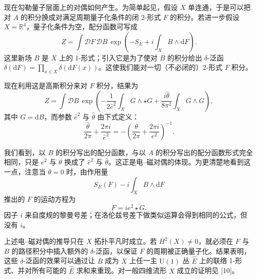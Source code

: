 \documentclass[11pt,a4paper,UTF8]{ctexart}
\begin{document}
现在勾勒量子层面上的对偶如何产生。为简单起见，假设 $X$ 单连通，于是可以把对 $A$ 的积分换成对满足周期量子化条件的闭 2-形式 $F$ 的积分。若进一步假设 $X=\mathbb{R}^{4}$，量子化条件为空，配分函数可写成
\[
    Z=\int \mathcal{D}F\,\mathcal{D}B\, \exp\left(-S_{E}+i\int_{X}B\wedge\mathrm{d}F\right).
\]
这里新场 $B$ 是 $X$ 上的 1-形式；引入它是为了使对 $B$ 的积分给出 $\delta$-泛函 $\delta(\mathrm{d}F)=\prod_{x\in X}\delta(\mathrm{d}F(x))$。这使我们能对一切（不必闭的）2-形式 $F$ 积分。

现在利用这是高斯积分来对 $F$ 积分，结果为
\[
    Z=\int \mathcal{D}B\, \exp\left(-\frac{1}{2\hat{e}^{2}}\int_{X}G\wedge\star G+\frac{i\hat{\theta}}{8\pi^{2}}\int_{X}G\wedge G\right),
\]
其中 $G=\mathrm{d}B$，而参数 $\hat{e}^{2}$ 与 $\hat{\theta}$ 由下式定义：
\[
    \frac{\hat{\theta}}{2\pi}+\frac{2\pi i}{\hat{e}^{2}}=-\left(\frac{\theta}{2\pi}+\frac{2\pi i}{e^{2}}\right)^{-1}.
\]


我们看到，以 $B$ 的积分写出的配分函数，与以 $A$ 的积分写出的配分函数形式完全相同，只是 $e^{2}$ 与 $\theta$ 换成了 $\hat{e}^{2}$ 与 $\hat{\theta}$。这正是电–磁对偶的体现。为更清楚地看到这一点，注意当 $\theta=0$ 时，由作用量
\[
    S_{E}(F)-i\int_{X}B\wedge\mathrm{d}F
\]
推出的 $F$ 的运动方程为
\[
    F=ie^{2}\star G .
\]
因子 $i$ 来自度规的黎曼号差；在洛伦兹号差下做类似运算会得到相同的公式，但没有 $i$。


上述电–磁对偶的推导只在 $X$ 拓扑平凡时成立。若 $H^{2}(X)\neq 0$，就必须在 $F$ 与 $B$ 的路径积分中插入额外的 $\delta$-泛函，以保证 $F$ 的周期被正确量子化。结果表明，这些 $\delta$-泛函的效果可以通过让 $B$ 成为 $X$ 上任一主 $\mathrm{U}(1)$ 丛 $\hat{E}$ 上的联络 1-形式、并对所有可能的 $\hat{E}$ 求和来重现。对一般四维流形 $X$ 成立的证明见 [10]。
\end{document}
